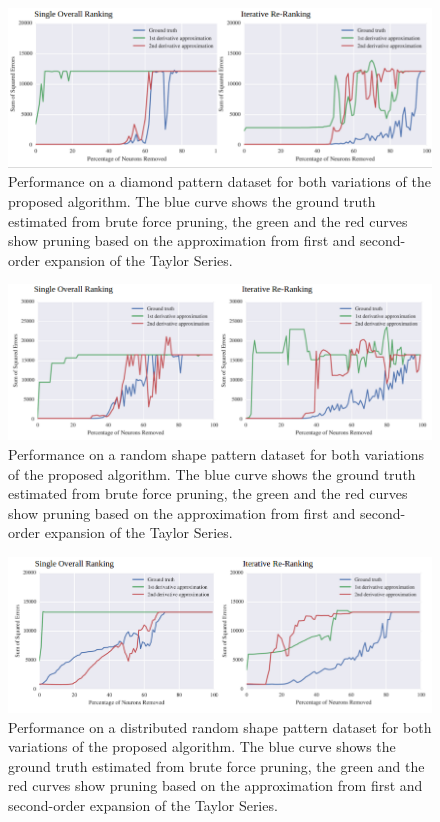 \begin{figure}
  \includegraphics[width=\linewidth]{diamond.png}
  \caption{Performance on a diamond pattern dataset for both variations of the proposed algorithm. The blue curve shows the ground truth estimated from brute force pruning, the green and the red curves show pruning based on the approximation from first and second-order expansion of the Taylor Series.}
  \label{fig:diamond}
\end{figure}

\begin{figure}
  \includegraphics[width=\linewidth]{rshape.png}
  \caption{Performance on a random shape pattern dataset for both variations of the proposed algorithm. The blue curve shows the ground truth estimated from brute force pruning, the green and the red curves show pruning based on the approximation from first and second-order expansion of the Taylor Series.}
  \label{fig:rshape}
\end{figure}

\begin{figure}
  \includegraphics[width=\linewidth]{drshape.png}
  \caption{Performance on a distributed random shape pattern dataset for both variations of the proposed algorithm. The blue curve shows the ground truth estimated from brute force pruning, the green and the red curves show pruning based on the approximation from first and second-order expansion of the Taylor Series.}
  \label{fig:drshape}
\end{figure}

